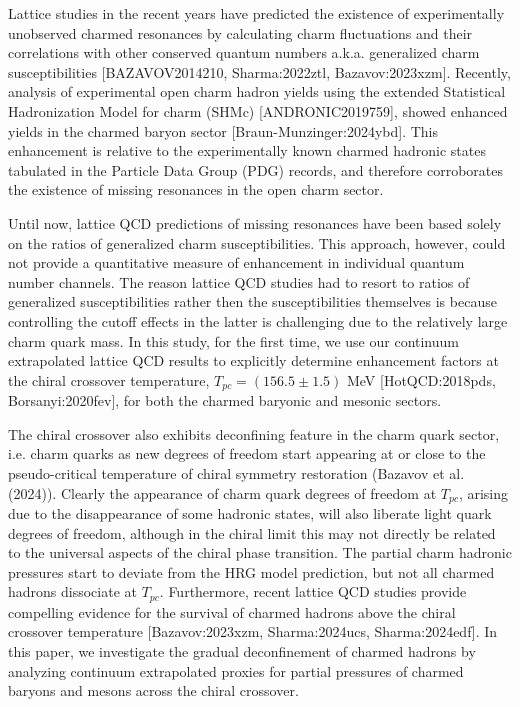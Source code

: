 \documentclass[11pt,a4paper]{article}
\begin{document}
Lattice studies in the recent years have predicted the existence of experimentally unobserved charmed resonances by calculating charm fluctuations and their correlations with other conserved quantum numbers a.k.a. generalized charm susceptibilities [BAZAVOV2014210, Sharma:2022ztl, Bazavov:2023xzm]. Recently, analysis of experimental  open charm hadron yields using the extended Statistical Hadronization Model for charm (SHMc) [ANDRONIC2019759], showed enhanced yields in the charmed baryon sector [Braun-Munzinger:2024ybd]. This enhancement is relative to the experimentally known charmed hadronic states tabulated in the Particle Data Group (PDG) records, and  therefore corroborates the existence of missing resonances in the open charm sector.

Until now, lattice QCD predictions of missing resonances have been based solely on the ratios of generalized charm susceptibilities. This approach, however, could not provide a quantitative measure of enhancement in individual quantum number channels. The reason lattice QCD studies had to resort to ratios of generalized susceptibilities rather then the susceptibilities themselves is because controlling the cutoff effects in the latter is challenging due to the relatively large charm quark mass.  In this study, for the first time, we use our continuum extrapolated lattice QCD results to explicitly determine enhancement factors at the chiral crossover temperature, ${T_{pc}=(156.5\pm1.5)}$ MeV [HotQCD:2018pds, Borsanyi:2020fev], for both the charmed baryonic and mesonic sectors.

The chiral crossover also exhibits deconfining feature in the charm quark sector, i.e. charm quarks as new degrees of freedom start appearing at or close to the pseudo-critical temperature of chiral symmetry restoration (Bazavov et al. (2024)). Clearly the appearance of charm quark degrees of freedom at $T_{pc}$, arising due to the disappearance of some hadronic states, will also liberate light quark degrees of freedom, although in the chiral limit this may not directly be related to the universal aspects of the chiral phase transition. The partial charm hadronic pressures start to deviate from the HRG model prediction, but not all charmed hadrons dissociate at $T_{pc}$. Furthermore, recent lattice QCD studies provide compelling evidence for the survival of charmed hadrons above the chiral crossover temperature [Bazavov:2023xzm, Sharma:2024ucs, Sharma:2024edf]. In this paper, we investigate the gradual deconfinement of charmed hadrons by analyzing continuum extrapolated proxies for partial pressures of charmed baryons and mesons across the chiral crossover.
\end{document}

